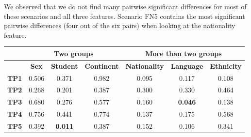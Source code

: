 %
We observed that we do not find many pairwise significant differences for most of these scenarios and all three features.
%
Scenario FN5 contains the most significant pairwise differences (four out of the six pairs) when looking at the nationality feature.
%
\begin{table}
    \small
    \centering
    \begin{tabular}{lccc|ccc}
        \toprule
                      & \multicolumn{3}{c}{\textbf{Two groups}} & \multicolumn{3}{c}{\textbf{More than two groups}}                                                                                                                                                                       \\
        \midrule
                      & \multicolumn{1}{c}{\textbf{Sex}}        & \multicolumn{1}{c}{\textbf{Student}}              & \multicolumn{1}{c}{\textbf{Continent}} & \multicolumn{1}{c}{\textbf{Nationality}} & \multicolumn{1}{c}{\textbf{Language}}  & \multicolumn{1}{c}{\textbf{Ethnicity}} \\
        \midrule
        \textbf{TP1}  & 0.506                                   & 0.371                                             & 0.982                                  & 0.095                                    & 0.117                                  & 0.108                                  \\
        \textbf{TP2}  & 0.268                                   & 0.201                                             & 0.387                                  & 0.300                                    & 0.330                                  & 0.464                                  \\
        \textbf{TP3}  & 0.680                                   & 0.276                                             & 0.577                                  & 0.160                                    & \cellcolor[HTML]{EFEFEF}\textbf{0.046} & 0.138                                  \\
        \textbf{TP4}  & 0.756                                   & 0.441                                             & 0.774                                  & 0.137                                    & 0.175                                  & 0.568                                  \\
        \textbf{TP5}  & 0.392                                   & \cellcolor[HTML]{EFEFEF}\textbf{0.011}            & 0.387                                  & 0.152                                    & 0.106                                  & 0.341                                  \\

\end{tabular}
\end{table}
